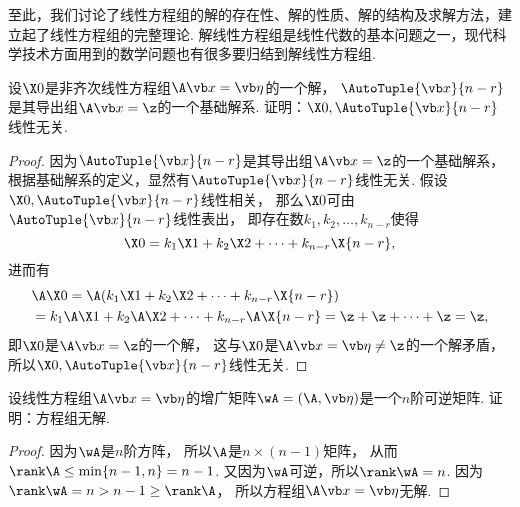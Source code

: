 至此，我们讨论了线性方程组的解的存在性、解的性质、解的结构及求解方法，建立起了线性方程组的完整理论.
解线性方程组是线性代数的基本问题之一，现代科学技术方面用到的数学问题也有很多要归结到解线性方程组.

\begin{example}
设\(\X0\)是非齐次线性方程组\(\A\x=\b\)的一个解，
\(\AutoTuple{\x}{n-r}\)是其导出组\(\A\x=\z\)的一个基础解系.
证明：\(\X0,\AutoTuple{\x}{n-r}\)线性无关.
\begin{proof}
因为\(\AutoTuple{\x}{n-r}\)是其导出组\(\A\x=\z\)的一个基础解系，
根据基础解系的定义，显然有\(\AutoTuple{\x}{n-r}\)线性无关.
假设\(\X0,\AutoTuple{\x}{n-r}\)线性相关，
那么\(\X0\)可由\(\AutoTuple{\x}{n-r}\)线性表出，
即存在数\(k_1,k_2,\dotsc,k_{n-r}\)使得\[
	\X0 = k_1 \X1 + k_2 \X2 + \dotsb + k_{n-r} \X{n-r},
\]
进而有\begin{align*}
	&\A\X0 = \A(k_1 \X1 + k_2 \X2 + \dotsb + k_{n-r} \X{n-r}) \\
	&= k_1 \A\X1 + k_2 \A\X2 + \dotsb + k_{n-r} \A\X{n-r}
	= \z + \z + \dotsb + \z = \z,
\end{align*}
即\(\X0\)是\(\A\x=\z\)的一个解，
这与\(\X0\)是\(\A\x=\b\neq\z\)的一个解矛盾，
所以\(\X0,\AutoTuple{\x}{n-r}\)线性无关.
\end{proof}
\end{example}

\begin{example}
设线性方程组\(\A\x=\b\)的增广矩阵\(\wA = (\A,\b)\)是一个\(n\)阶可逆矩阵.
证明：方程组无解.
\begin{proof}
因为\(\wA\)是\(n\)阶方阵，
所以\(\A\)是\(n \times (n-1)\)矩阵，
从而\(\rank\A \leq \min\{n-1,n\} = n-1\).
又因为\(\wA\)可逆，所以\(\rank\wA = n\).
因为\(\rank\wA = n > n-1 \geq \rank\A\)，
所以方程组\(\A\x=\b\)无解.
\end{proof}
\end{example}

